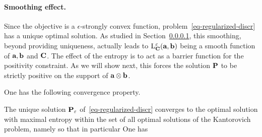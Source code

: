 

\paragraph{Smoothing effect.}

Since the objective is a $\epsilon$-strongly convex function, problem~\ref{eq-regularized-discr} has a unique optimal solution. 
%
As studied in Section~\ref{}, this smoothing, beyond providing uniqueness, actually leads to $\MKD_\C^\epsilon(\a,\b)$ being a smooth function of $\a, \b$ and $\C$. 
%
The effect of the entropy is to act as a barrier function for the positivity constraint. As we will show next, this forces the solution $\P$ to be strictly positive on the support of $\a \otimes \b$. 

One has the following convergence property.
 
 
\begin{prop}\label{prop-convergence-eps}
The unique solution $\P_\epsilon$ of~\eqref{eq-regularized-discr} converges to the optimal solution with maximal entropy within the set of all optimal solutions of the Kantorovich problem, namely
so that in particular
One has
\end{prop}

